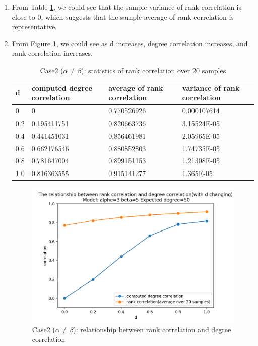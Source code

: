 \documentclass{article}
\begin{document}
\begin{enumerate}
\begin{enumerate}
\item From Table \ref{table2}, we could see that the sample variance of rank correlation is close to 0, which suggests that the sample average of rank correlation is representative.
\item From Figure \ref{fig: corrs_2}, we could see as d increases,  degree correlation increases, and rank correlation increases.
\begin{table}
\centering
\caption{Case2 ($\alpha \neq \beta$): statistics of rank correlation over 20 samples}
\label{table2}
\begin{tabular}{|l|l|l|l|}
\hline
d   & computed degree correlation & average of rank correlation & variance of rank correlation \\
\hline
0   & 0                           & 0.770526926                            & 0.000107614 \\
\hline
0.2 & 0.195411751                & 0.820663736                            & 3.15524E-05 \\
\hline
0.4 &0.441451031                &0.856461981                            & 2.05965E-05
 \\
\hline
0.6 & 0.662176546                 & 0.880852803                         & 1.74735E-05
 \\
\hline
0.8 &0.781647004                & 0.899151153                           & 1.21308E-05
 \\
\hline
1.0 & 0.816363555                 & 0.915141277                             & 1.365E-05
\\
\hline
\end{tabular}
\end{table}


\begin{figure}
\includegraphics[scale=0.8]{final_images/case2_corrs_relation.png}
\caption{Case2 ($\alpha \neq \beta$): relationship between rank correlation and degree correlation}
\label{fig: corrs_2}
\end{figure}

\end{enumerate}

\end{enumerate}
\end{document}

